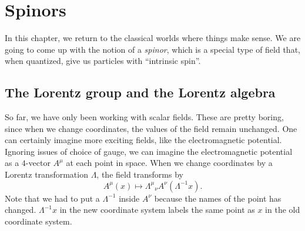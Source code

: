 \documentclass[a4paper]{article}
\begin{document}

\section{Spinors}
In this chapter, we return to the classical worlds where things make sense. We are going to come up with the notion of a \emph{spinor}, which is a special type of field that, when quantized, give us particles with ``intrinsic spin''.

\subsection{The Lorentz group and the Lorentz algebra}
So far, we have only been working with scalar fields. These are pretty boring, since when we change coordinates, the values of the field remain unchanged. One can certainly imagine more exciting fields, like the electromagnetic potential. Ignoring issues of choice of gauge, we can imagine the electromagnetic potential as a $4$-vector $A^\mu$ at each point in space. When we change coordinates by a Lorentz transformation $\Lambda$, the field transforms by
\[
  A^\mu(x) \mapsto \Lambda^\mu\!_\nu A^\nu(\Lambda^{-1} x).
\]
Note that we had to put a $\Lambda^{-1}$ inside $A^\nu$ because the names of the point has changed. $\Lambda^{-1}x$ in the new coordinate system labels the same point as $x$ in the old coordinate system.
\end{document}

